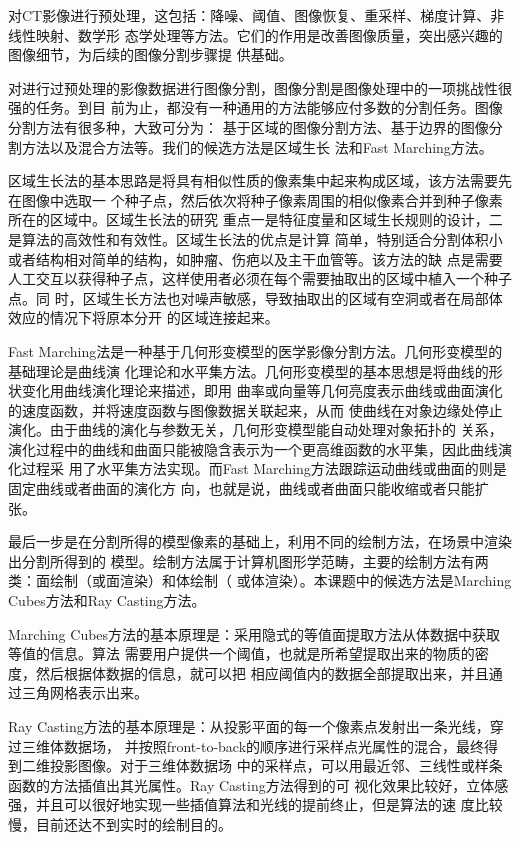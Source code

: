 对CT影像进行预处理，这包括：降噪、阈值、图像恢复、重采样、梯度计算、非线性映射、数学形
态学处理等方法。它们的作用是改善图像质量，突出感兴趣的图像细节，为后续的图像分割步骤提
供基础。

对进行过预处理的影像数据进行图像分割，图像分割是图像处理中的一项挑战性很强的任务。到目
前为止，都没有一种通用的方法能够应付多数的分割任务。图像分割方法有很多种，大致可分为：
基于区域的图像分割方法、基于边界的图像分割方法以及混合方法等。我们的候选方法是区域生长
法和Fast Marching方法。

区域生长法的基本思路是将具有相似性质的像素集中起来构成区域，该方法需要先在图像中选取一
个种子点，然后依次将种子像素周围的相似像素合并到种子像素所在的区域中。区域生长法的研究
重点一是特征度量和区域生长规则的设计，二是算法的高效性和有效性。区域生长法的优点是计算
简单，特别适合分割体积小或者结构相对简单的结构，如肿瘤、伤疤以及主干血管等。该方法的缺
点是需要人工交互以获得种子点，这样使用者必须在每个需要抽取出的区域中植入一个种子点。同
时，区域生长方法也对噪声敏感，导致抽取出的区域有空洞或者在局部体效应的情况下将原本分开
的区域连接起来。

Fast Marching法是一种基于几何形变模型的医学影像分割方法。几何形变模型的基础理论是曲线演
化理论和水平集方法。几何形变模型的基本思想是将曲线的形状变化用曲线演化理论来描述，即用
曲率或向量等几何亮度表示曲线或曲面演化的速度函数，并将速度函数与图像数据关联起来，从而
使曲线在对象边缘处停止演化。由于曲线的演化与参数无关，几何形变模型能自动处理对象拓扑的
关系，演化过程中的曲线和曲面只能被隐含表示为一个更高维函数的水平集，因此曲线演化过程采
用了水平集方法实现。而Fast Marching方法跟踪运动曲线或曲面的则是固定曲线或者曲面的演化方
向，也就是说，曲线或者曲面只能收缩或者只能扩张。

最后一步是在分割所得的模型像素的基础上，利用不同的绘制方法，在场景中渲染出分割所得到的
模型。绘制方法属于计算机图形学范畴，主要的绘制方法有两类：面绘制（或面渲染）和体绘制（
或体渲染）。本课题中的候选方法是Marching Cubes方法和Ray Casting方法。

Marching Cubes方法的基本原理是：采用隐式的等值面提取方法从体数据中获取等值的信息。算法
需要用户提供一个阈值，也就是所希望提取出来的物质的密度，然后根据体数据的信息，就可以把
相应阈值内的数据全部提取出来，并且通过三角网格表示出来。

Ray Casting方法的基本原理是：从投影平面的每一个像素点发射出一条光线，穿过三维体数据场，
并按照front-to-back的顺序进行采样点光属性的混合，最终得到二维投影图像。对于三维体数据场
中的采样点，可以用最近邻、三线性或样条函数的方法插值出其光属性。Ray Casting方法得到的可
视化效果比较好，立体感强，并且可以很好地实现一些插值算法和光线的提前终止，但是算法的速
度比较慢，目前还达不到实时的绘制目的。

